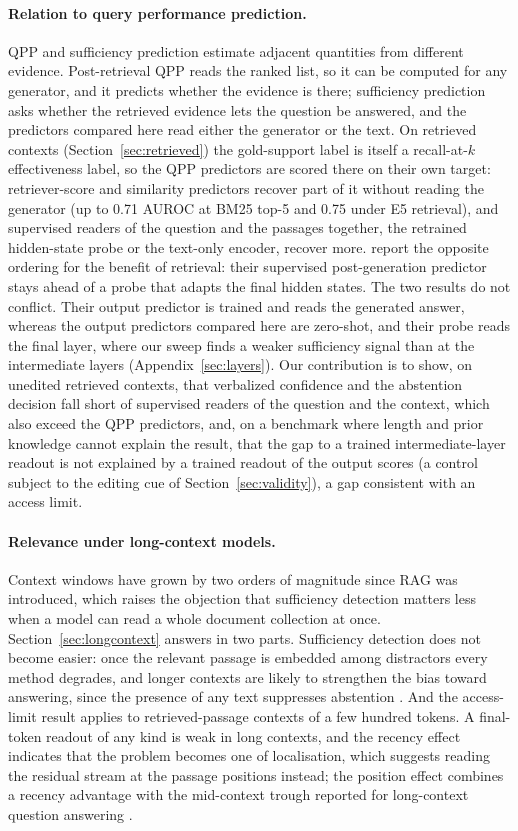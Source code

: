 \documentclass[acmsmall,screen,review]{acmart}
\begin{document}
\paragraph{Relation to query performance prediction.}
QPP and sufficiency prediction estimate adjacent quantities from different evidence. Post-retrieval QPP reads the ranked list, so it can be computed for any generator, and it predicts whether the evidence is there; sufficiency prediction asks whether the retrieved evidence lets the question be answered, and the predictors compared here read either the generator or the text. On retrieved contexts (Section~\ref{sec:retrieved}) the gold-support label is itself a recall-at-$k$ effectiveness label, so the QPP predictors are scored there on their own target: retriever-score and similarity predictors recover part of it without reading the generator (up to 0.71 AUROC at BM25 top-5 and 0.75 under E5 retrieval), and supervised readers of the question and the passages together, the retrained hidden-state probe or the text-only encoder, recover more. \citet{dado2026benefit} report the opposite ordering for the benefit of retrieval: their supervised post-generation predictor stays ahead of a probe that adapts the final hidden states. The two results do not conflict. Their output predictor is trained and reads the generated answer, whereas the output predictors compared here are zero-shot, and their probe reads the final layer, where our sweep finds a weaker sufficiency signal than at the intermediate layers (Appendix~\ref{sec:layers}). Our contribution is to show, on unedited retrieved contexts, that verbalized confidence and the abstention decision fall short of supervised readers of the question and the context, which also exceed the QPP predictors, and, on a benchmark where length and prior knowledge cannot explain the result, that the gap to a trained intermediate-layer readout is not explained by a trained readout of the output scores (a control subject to the editing cue of Section~\ref{sec:validity}), a gap consistent with an access limit.

\paragraph{Relevance under long-context models.}
Context windows have grown by two orders of magnitude since RAG was introduced, which raises the objection that sufficiency detection matters less when a model can read a whole document collection at once. Section~\ref{sec:longcontext} answers in two parts. Sufficiency detection does not become easier: once the relevant passage is embedded among distractors every method degrades, and longer contexts are likely to strengthen the bias toward answering, since the presence of any text suppresses abstention \citep{joren2025sufficient}. And the access-limit result applies to retrieved-passage contexts of a few hundred tokens. A final-token readout of any kind is weak in long contexts, and the recency effect indicates that the problem becomes one of localisation, which suggests reading the residual stream at the passage positions instead; the position effect combines a recency advantage with the mid-context trough reported for long-context question answering \citep{liu2024lost}.
\end{document}
